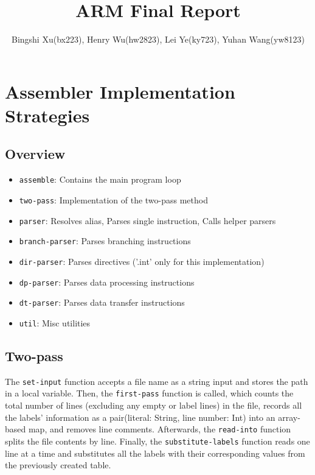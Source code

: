 \documentclass[11pt]{article}
\begin{document}
\title{ARM Final Report}
\author{Bingshi Xu(bx223), Henry Wu(hw2823), Lei Ye(ky723), Yuhan Wang(yw8123)}

\maketitle

\section{Assembler Implementation Strategies}
\subsection{Overview}
\begin{itemize}
    \item \texttt{assemble}: Contains the main program loop
    \item \texttt{two-pass}: Implementation of the two-pass method
    \item \texttt{parser}: Resolves alias, Parses single instruction, Calls helper parsers
    \item \texttt{branch-parser}: Parses branching instructions
    \item \texttt{dir-parser}: Parses directives ('.int' only for this implementation)
    \item \texttt{dp-parser}: Parses data processing instructions
    \item \texttt{dt-parser}: Parses data transfer instructions
    \item \texttt{util}: Misc utilities
\end{itemize}

\subsection{Two-pass}
The \texttt{set-input} function accepts a file name as a string input and stores the path in a local variable. Then, the 
\texttt{first-pass} function is called, which counts the total number of lines (excluding any empty or label lines) in the 
file, records all the labels' information as a pair(literal: String, line number: Int) into an array-based map, and removes line comments. 
Afterwards, the \texttt{read-into} function splits the file contents by line. Finally, the \texttt{substitute-labels} function 
reads one line at a time and substitutes all the labels with their corresponding values from the previously created table.
\end{document}
